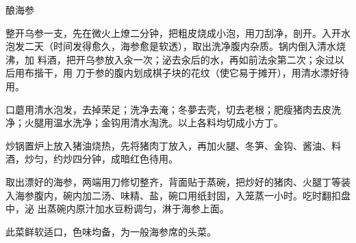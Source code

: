 \begin{recipe}[一品海参]{酿海参}

\ingredients


\preparation

\step 整开乌参一支，先在微火上燎二分钟，把粗皮烧成小泡，用刀刮净，剖开。入开水
泡发二天（时间发得愈久，海参愈是软透），取出洗净腹内杂质。锅内倒入清水烧沸，加
料酒，把开乌参放入汆一次；泌去汆后的水，再如前法汆第二次；汆过以后用布揩干，用
刀于参的腹内划成棋子块的花纹（使它易于摊开），用清水漂好待用。

\step 口蘑用清水泡发，去掉荣足；洗净去淹；冬夢去壳，切去老根；肥瘦猪肉去皮洗
净；火腿用温水洗净；金钩用清水淘洗。以上各料均切成小方丁。

\step 炒锅置炉上放入猪油烧热，先将猪肉丁放入，再加火腿、冬笋、金钩、酱油、料
酒，炒匀，约炒四分钟，成暗红色待用。

\step 取出漂好的海参，两端用刀修切整齐，背面贴于蒸碗，把炒好的猪肉、火腿丁等装
入海参腹内，碗内加二汤、味精、盐，碗口用纸封固，入笼蒸一小时。吃时翻扣盘中，泌
出蒸碗内原汁加水豆粉调匀，淋于海参上面。

\features

此菜鲜软适口，色味均备，为一般海参席的头菜。

\end{recipe}

